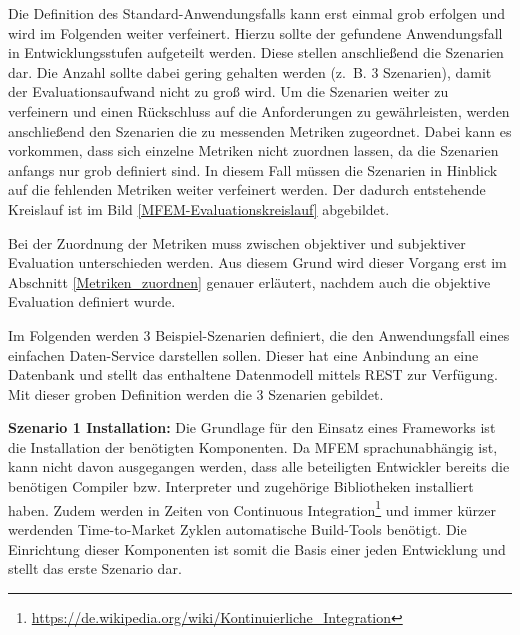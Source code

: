 Die Definition des Standard-Anwendungsfalls kann erst einmal grob erfolgen und wird im Folgenden weiter verfeinert. Hierzu sollte der gefundene Anwendungsfall in Entwicklungsstufen aufgeteilt werden. Diese stellen anschließend die Szenarien dar. Die Anzahl sollte dabei gering gehalten werden (z.~B. 3 Szenarien), damit der Evaluationsaufwand nicht zu groß wird. Um die Szenarien weiter zu verfeinern und einen Rückschluss auf die Anforderungen zu gewährleisten, werden anschließend den Szenarien die zu messenden Metriken zugeordnet. Dabei kann es vorkommen, dass sich einzelne Metriken nicht zuordnen lassen, da die Szenarien anfangs nur grob definiert sind. In diesem Fall müssen die Szenarien in Hinblick auf die fehlenden Metriken weiter verfeinert werden. Der dadurch entstehende Kreislauf ist im Bild \ref{MFEM-Evaluationskreislauf} abgebildet.       


Bei der Zuordnung der Metriken muss zwischen objektiver und subjektiver Evaluation unterschieden werden. Aus diesem Grund wird dieser Vorgang erst im Abschnitt \ref{Metriken_zuordnen} genauer erläutert, nachdem auch die objektive Evaluation definiert wurde.


Im Folgenden werden 3 Beispiel-Szenarien definiert, die den Anwendungsfall eines einfachen Daten-Service darstellen sollen. Dieser hat eine Anbindung an eine Datenbank und stellt das enthaltene Datenmodell mittels \ac{REST} zur Verfügung. Mit dieser groben Definition werden die 3 Szenarien gebildet.

\textbf{Szenario 1 Installation:} Die Grundlage für den Einsatz eines Frameworks ist die Installation der benötigten Komponenten. Da \ac{MFEM} sprachunabhängig ist, kann nicht davon ausgegangen werden, dass alle beteiligten Entwickler bereits die benötigen Compiler bzw. Interpreter und zugehörige Bibliotheken installiert haben. Zudem werden in Zeiten von Continuous Integration\footnote{\url{https://de.wikipedia.org/wiki/Kontinuierliche_Integration}} und immer kürzer werdenden Time-to-Market Zyklen automatische Build-Tools benötigt. Die Einrichtung dieser Komponenten ist somit die Basis einer jeden Entwicklung und stellt das erste Szenario dar.


